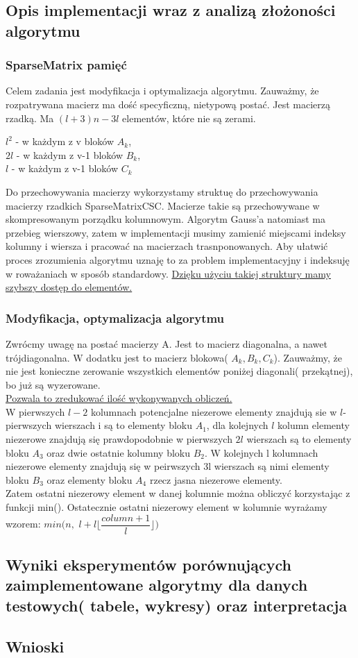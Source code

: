 \documentclass[11pt]{article}
\begin{document}
\begin{flushleft}
\subsection{Opis implementacji wraz z analizą złożoności algorytmu}
\subsubsection{SparseMatrix pamięć}
Celem zadania jest modyfikacja i optymalizacja algorytmu. Zauważmy, że rozpatrywana macierz ma dość specyficzną, nietypową postać. Jest macierzą rzadką. Ma $(l+3)n-3l$ elementów, które nie są zerami.\\
\begin{center}
$l^2$ - w każdym z v bloków $A_k$, \\ $2l$ - w każdym z v-1 bloków $B_k$, \\ $l$ - w każdym z v-1 bloków $C_k$\end{center} Do przechowywania macierzy wykorzystamy struktuę do przechowywania macierzy rzadkich SparseMatrixCSC. Macierze takie są przechowywane w skompresowanym porządku kolumnowym. Algorytm Gauss'a natomiast ma przebieg wierszowy, zatem w implementacji musimy zamienić miejscami indeksy kolumny i wiersza i pracować na macierzach trasnponowanych. Aby ułatwić proces zrozumienia algorytmu uznaję to za problem implementacyjny i indeksuję w roważaniach w sposób standardowy. \underline{Dzięku użyciu takiej struktury mamy szybszy dostęp do elementów.}
\subsubsection{Modyfikacja, optymalizacja algorytmu}
Zwrócmy uwagę na postać macierzy A. Jest to macierz diagonalna, a nawet trójdiagonalna. W dodatku jest to macierz blokowa( $A_k,B_k,C_k$). Zauważmy, że nie jest konieczne zerowanie wszystkich elementów poniżej diagonali( przekątnej), bo już są wyzerowane. \\ \underline{Pozwala to zredukować ilość wykonywanych obliczeń.}\\ W pierwszych $l-2$ kolumnach potencjalne niezerowe elementy znajdują sie w $l$-pierwszych wierszach i są to elementy bloku $A_1$, dla kolejnych $l$ kolumn elementy niezerowe znajdują się prawdopodobnie w pierwszych $2l$ wierszach są to elementy bloku $A_3$ oraz dwie ostatnie kolumny bloku $B_2$. W kolejnych l kolumnach niezerowe elementy znajdują się w peirwszych 3l wierszach są nimi elementy bloku $B_3$ oraz elementy bloku $A_4$ rzecz jasna niezerowe elementy.\\
Zatem ostatni niezerowy element w danej kolumnie można obliczyć korzystając z funkcji min(). Ostatecznie ostatni niezerowy element w kolumnie wyrażamy wzorem: $min \Big( n,$ $l+l \Big \lfloor \dfrac{column+1}{l} \Big \rfloor \Big)$

\subsection{Wyniki eksperymentów porównujących zaimplementowane algorytmy dla danych testowych( tabele, wykresy) oraz interpretacja}
\subsection{Wnioski}
\end{flushleft}
\end{document}
